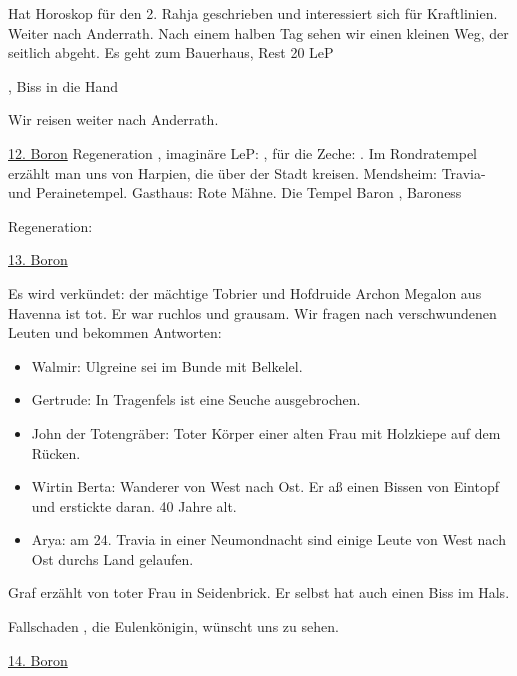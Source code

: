 Hat Horoskop für den 2. Rahja geschrieben und interessiert sich für Kraftlinien. 
Weiter nach Anderrath. Nach einem halben Tag sehen wir einen kleinen Weg, der seitlich abgeht.
Es geht zum Bauerhaus, 
 Rest 20 LeP

, Biss in die Hand                                       

Wir reisen weiter nach Anderrath. 

\underline{12. Boron}
Regeneration , imaginäre LeP: , für die Zeche: . Im Rondratempel erzählt man uns von Harpien, die über der Stadt kreisen. 
Mendsheim: Travia- und Perainetempel. Gasthaus: Rote Mähne. Die Tempel Baron , Baroness 

Regeneration: 

\underline{13. Boron}

Es wird verkündet: der mächtige Tobrier und Hofdruide Archon Megalon aus Havenna ist tot. Er war ruchlos und grausam. Wir fragen nach verschwundenen Leuten und bekommen Antworten:
\begin{itemize}
\item Walmir: Ulgreine sei im Bunde mit Belkelel. 
\item Gertrude: In Tragenfels ist eine Seuche ausgebrochen. 
\item John der Totengräber: Toter Körper einer alten Frau mit Holzkiepe auf dem Rücken.
\item Wirtin Berta: Wanderer von West nach Ost. Er aß einen Bissen von Eintopf und erstickte daran. 40 Jahre alt.  
\item Arya: am 24. Travia in einer Neumondnacht sind einige Leute von West nach Ost durchs Land gelaufen. 
\end{itemize}
Graf erzählt von toter Frau in Seidenbrick. Er selbst hat auch einen Biss im Hals. 

  Fallschaden
, die Eulenkönigin,  wünscht uns zu sehen. 

\underline{14. Boron}

